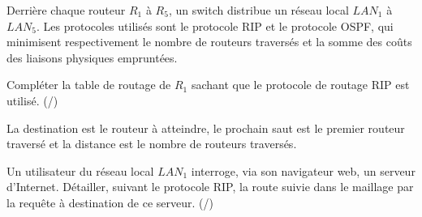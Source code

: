 Derrière chaque routeur $R_1$ à $R_5$, un switch distribue un réseau local $LAN_1$ à $LAN_5$.
\smallskip
Les protocoles utilisés sont le protocole RIP et le protocole OSPF, qui minimisent respectivement le nombre de routeurs traversés et la somme des coûts des liaisons physiques empruntées.

\medskip

\begin{enumerate}[series=monDS, resume]

\begin{minipage}[h]{0.5\textwidth}
    \item Compléter la table de routage de $R_1$ sachant que le protocole de routage RIP est utilisé. (/)

    La destination est le routeur à atteindre, le prochain saut est le premier routeur traversé et la distance est le nombre de routeurs traversés.

\medskip

\item Un utilisateur du réseau local $LAN_1$ interroge, via son navigateur web, un serveur d'Internet. Détailler, suivant le protocole RIP, la route suivie dans le maillage par la requête à destination de ce serveur. (/)


\end{minipage}
\end{enumerate}

